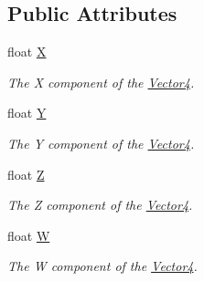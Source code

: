 \subsection*{Public Attributes}
\begin{DoxyCompactItemize}
\item 
float \hyperlink{struct_open_t_k_1_1_vector4_a8dabc9b9a0cf582c6e00d3670ead72ca}{X}
\begin{DoxyCompactList}\small\item\em The X component of the \hyperlink{struct_open_t_k_1_1_vector4}{Vector4}. \end{DoxyCompactList}\item 
float \hyperlink{struct_open_t_k_1_1_vector4_a241130b43eaa8868cb77ceb86fa32dcb}{Y}
\begin{DoxyCompactList}\small\item\em The Y component of the \hyperlink{struct_open_t_k_1_1_vector4}{Vector4}. \end{DoxyCompactList}\item 
float \hyperlink{struct_open_t_k_1_1_vector4_aa1b36c76315defc174611893d1260b46}{Z}
\begin{DoxyCompactList}\small\item\em The Z component of the \hyperlink{struct_open_t_k_1_1_vector4}{Vector4}. \end{DoxyCompactList}\item 
float \hyperlink{struct_open_t_k_1_1_vector4_a637c8b7da3fc2c3745776d95438032a7}{W}
\begin{DoxyCompactList}\small\item\em The W component of the \hyperlink{struct_open_t_k_1_1_vector4}{Vector4}. \end{DoxyCompactList}\end{DoxyCompactItemize}
